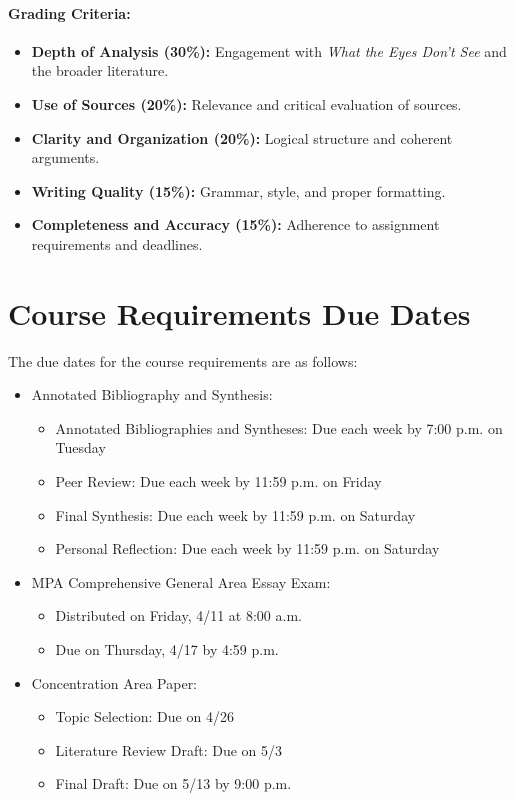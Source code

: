 \documentclass[12pt, letterpaper]{article}
\begin{document}
\paragraph*{Grading Criteria:}
\begin{itemize}
    \item \textbf{Depth of Analysis (30\%):} Engagement with \textit{What the Eyes Don’t See} and the broader literature.
    \item \textbf{Use of Sources (20\%):} Relevance and critical evaluation of sources.
    \item \textbf{Clarity and Organization (20\%):} Logical structure and coherent arguments.
    \item \textbf{Writing Quality (15\%):} Grammar, style, and proper formatting.
    \item \textbf{Completeness and Accuracy (15\%):} Adherence to assignment requirements and deadlines.
\end{itemize}


\section{Course Requirements Due Dates}

The due dates for the course requirements are as follows:
    \begin{itemize}
        \item Annotated Bibliography and Synthesis: 
        \begin{itemize}
            \item Annotated Bibliographies and Syntheses: Due each week by 7:00 p.m. on Tuesday
            \item Peer Review: Due each week by 11:59 p.m. on Friday
            \item Final Synthesis: Due each week by 11:59 p.m. on Saturday
            \item Personal Reflection: Due each week by 11:59 p.m. on Saturday
        \end{itemize}
        \item MPA Comprehensive General Area Essay Exam:
        \begin{itemize}
            \item Distributed on Friday, 4/11 at 8:00 a.m.
            \item Due on Thursday, 4/17 by 4:59 p.m.
        \end{itemize}
        \item Concentration Area Paper:
        \begin{itemize}
            \item Topic Selection: Due on 4/26
            \item Literature Review Draft: Due on 5/3
            \item Final Draft: Due on 5/13 by 9:00 p.m.
        \end{itemize}
    \end{itemize}
\end{document}
